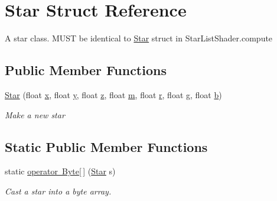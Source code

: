 \hypertarget{struct_star}{}\section{Star Struct Reference}
\label{struct_star}


A star class. M\+U\+ST be identical to \mbox{\hyperlink{struct_star}{Star}} struct in Star\+List\+Shader.\+compute  


\subsection*{Public Member Functions}
\begin{DoxyCompactItemize}
\item 
\mbox{\hyperlink{struct_star_a172d7df38867ea20fc13984efdc7a7eb}{Star}} (float \mbox{\hyperlink{struct_star_a28e9191b275b9a61792f206185c2a852}{x}}, float \mbox{\hyperlink{struct_star_a5ebda39c55380dcd3586dc32baac647d}{y}}, float \mbox{\hyperlink{struct_star_a00716c62574f63e932fb031d3d53a9f6}{z}}, float \mbox{\hyperlink{struct_star_a478e590dc67183b8252670b4e51752d7}{m}}, float \mbox{\hyperlink{struct_star_a8b93e00f216854cad87ac6f61e04b0f3}{r}}, float \mbox{\hyperlink{struct_star_ad9034f40a9923febb7596b06258278c8}{g}}, float \mbox{\hyperlink{struct_star_a3469c5e78552834a63b5d4566ff5bdd7}{b}})
\begin{DoxyCompactList}\small\item\em Make a new star \end{DoxyCompactList}\end{DoxyCompactItemize}
\subsection*{Static Public Member Functions}
\begin{DoxyCompactItemize}
\item 
static \mbox{\hyperlink{struct_star_a59ba9ab515e5fbd80be0b6cbef8a450a}{operator Byte\mbox{[}$\,$\mbox{]}}} (\mbox{\hyperlink{struct_star}{Star}} s)
\begin{DoxyCompactList}\small\item\em Cast a star into a byte array. \end{DoxyCompactList}\end{DoxyCompactItemize}

